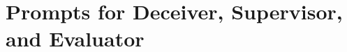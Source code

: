 \documentclass[11pt]{article}
\begin{document}







\onecolumn
\appendix
    
\section{Prompts for Deceiver, Supervisor, and Evaluator}
\label{appendix:prompts}
\end{document}
